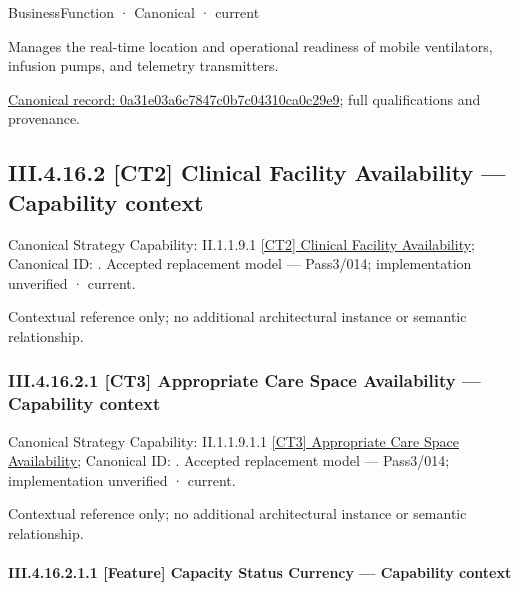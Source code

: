 \label{element:0a31e03a6c7847c0b7c04310ca0c29e9}
{\small BusinessFunction · Canonical · current}\par

Manages the real-time location and operational readiness of mobile ventilators, infusion pumps, and telemetry transmitters.


{\footnotesize \href{../../../../../../../../continuum/business/business-function/0a31e03a6c7847c0b7c04310ca0c29e9.md}{Canonical record: 0a31e03a6c7847c0b7c04310ca0c29e9}; full qualifications and provenance.}\par
\subsection*{III.4.16.2 [CT2] Clinical Facility Availability — Capability context}
\label{navigation:III.4.16.2}

{\small Canonical Strategy Capability: II.1.1.9.1 \hyperref[element:a63d4c432ddb43ddbad687f9634ce225]{[CT2] Clinical Facility Availability}; Canonical ID: \texttt{}. Accepted replacement model — Pass3/014; implementation unverified · current.}\par
Contextual reference only; no additional architectural instance or semantic relationship.\par
\subsubsection*{III.4.16.2.1 [CT3] Appropriate Care Space Availability — Capability context}
\label{navigation:III.4.16.2.1}

{\small Canonical Strategy Capability: II.1.1.9.1.1 \hyperref[element:f6a8a37f22954b37850c458f119bcc75]{[CT3] Appropriate Care Space Availability}; Canonical ID: \texttt{}. Accepted replacement model — Pass3/014; implementation unverified · current.}\par
Contextual reference only; no additional architectural instance or semantic relationship.\par
\paragraph*{III.4.16.2.1.1 [Feature] Capacity Status Currency — Capability context}
\label{navigation:III.4.16.2.1.1}

